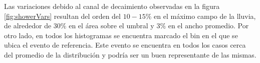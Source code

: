	Las variaciones debido al canal de decaimiento observadas en la figura \ref{fig:showerVars} resultan del orden del $10-15\%$ en el m\'aximo campo de la lluvia, de alrededor de $30\%$ en el \'area sobre el umbral y $3\%$ en el ancho promedio.
	Por otro lado, en todos los histogramas se encuentra marcado el bin en el que se ubica el evento de referencia.
	Este evento se encuentra en todos los casos cerca del promedio de la distribuci\'on y podr\'ia ser un buen representante de las mismas.